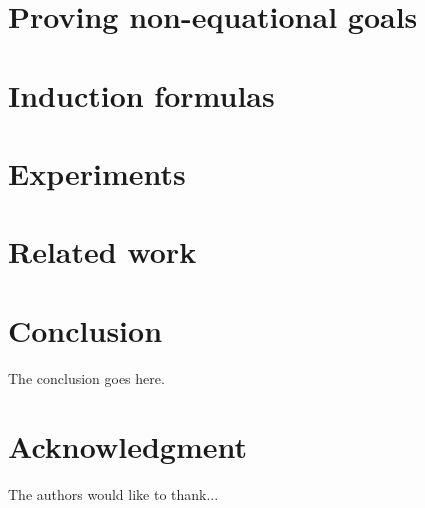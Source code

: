 \documentclass[conference]{IEEEtran}
\begin{document}
	\section{Proving non-equational goals}
	\label{sec:predicates}
	

	\section{Induction formulas}
	\label{sec:induction_formulas}
	
	
	\section{Experiments}
	\label{sec:experiments}
	

	\section{Related work}
	\label{sec:related_work}
	

	\section{Conclusion}
	The conclusion goes here.
	
	
	
	
	
	
	\section*{Acknowledgment}
	
	
	The authors would like to thank...
	
	
	
	
	
	
	
	
\end{document}
